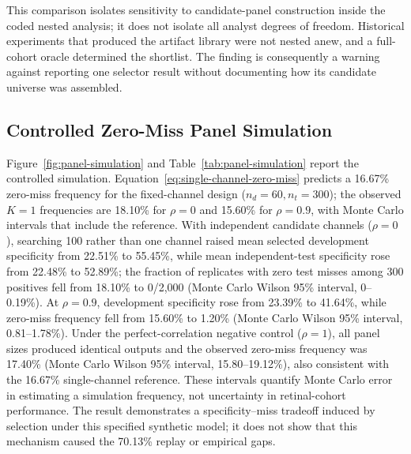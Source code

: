 \documentclass{ieeeaccess}
\begin{document}
This comparison isolates sensitivity to candidate-panel construction inside the coded nested analysis; it does not isolate all analyst degrees of freedom. Historical experiments that produced the artifact library were not nested anew, and a full-cohort oracle determined the shortlist. The finding is consequently a warning against reporting one selector result without documenting how its candidate universe was assembled.

\subsection{Controlled Zero-Miss Panel Simulation}
Figure~\ref{fig:panel-simulation} and Table~\ref{tab:panel-simulation} report the controlled simulation. Equation~\eqref{eq:single-channel-zero-miss} predicts a 16.67\% zero-miss frequency for the fixed-channel design ($n_d=60,n_t=300$); the observed $K=1$ frequencies are 18.10\% for $\rho=0$ and 15.60\% for $\rho=0.9$, with Monte Carlo intervals that include the reference. With independent candidate channels ($\rho=0$), searching 100 rather than one channel raised mean selected development specificity from 22.51\% to 55.45\%, while mean independent-test specificity rose from 22.48\% to 52.89\%; the fraction of replicates with zero test misses among 300 positives fell from 18.10\% to 0/2,000 (Monte Carlo Wilson 95\% interval, 0--0.19\%). At $\rho=0.9$, development specificity rose from 23.39\% to 41.64\%, while zero-miss frequency fell from 15.60\% to 1.20\% (Monte Carlo Wilson 95\% interval, 0.81--1.78\%). Under the perfect-correlation negative control ($\rho=1$), all panel sizes produced identical outputs and the observed zero-miss frequency was 17.40\% (Monte Carlo Wilson 95\% interval, 15.80--19.12\%), also consistent with the 16.67\% single-channel reference. These intervals quantify Monte Carlo error in estimating a simulation frequency, not uncertainty in retinal-cohort performance. The result demonstrates a specificity--miss tradeoff induced by selection under this specified synthetic model; it does not show that this mechanism caused the 70.13\% replay or empirical gaps.
\end{document}
